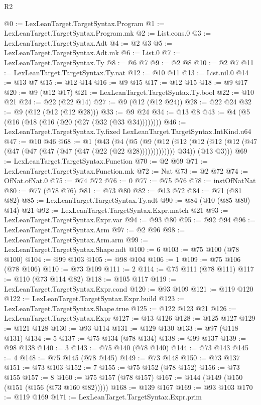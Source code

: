 \begin{lexlean}{R2}
\begin{coremodule}
@0 := LexLeanTarget.TargetSyntax.Program
@1 := LexLeanTarget.TargetSyntax.Program.mk
@2 := List.cons.{0}
@3 := LexLeanTarget.TargetSyntax.Adt
@4 := @2 @3
@5 := LexLeanTarget.TargetSyntax.Adt.mk
@6 := List.{0}
@7 := LexLeanTarget.TargetSyntax.Ty
@8 := @6 @7
@9 := @2 @8
@10 := @2 @7
@11 := LexLeanTarget.TargetSyntax.Ty.nat
@12 := @10 @11
@13 := List.nil.{0}
@14 := @13 @7
@15 := @12 @14
@16 := @9 @15
@17 := @12 @15
@18 := @9 @17
@20 := @9 (@12 @17)
@21 := LexLeanTarget.TargetSyntax.Ty.bool
@22 := @10 @21
@24 := @22 (@22 @14)
@27 := @9 (@12 (@12 @24))
@28 := @22 @24
@32 := @9 (@12 (@12 (@12 @28)))
@33 := @9 @24
@34 := @13 @8
@43 := @4 (@5 (@16 (@18 (@16 (@20 (@27 (@32 (@33 @34))))))))
@46 := LexLeanTarget.TargetSyntax.Ty.fixed LexLeanTarget.TargetSyntax.IntKind.u64
@47 := @10 @46
@68 := @1
    (@43
      (@4
        (@5
          (@9
            (@12 (@12 (@12 (@12 (@12 (@47 (@47 (@47 (@47 (@47 (@47 (@22 (@22 @28)))))))))))))
            @34))
        (@13 @3)))
@69 := LexLeanTarget.TargetSyntax.Function
@70 := @2 @69
@71 := LexLeanTarget.TargetSyntax.Function.mk
@72 := Nat
@73 := @2 @72
@74 := OfNat.ofNat.{0}
@75 := @74 @72
@76 := 0
@77 := @75 @76
@78 := instOfNatNat
@80 := @77 (@78 @76)
@81 := @73 @80
@82 := @13 @72
@84 := @71 (@81 @82)
@85 := LexLeanTarget.TargetSyntax.Ty.adt
@90 := @84 (@10 (@85 @80) @14) @21
@92 := LexLeanTarget.TargetSyntax.Expr.match @21
@93 := LexLeanTarget.TargetSyntax.Expr.var
@94 := @93 @80
@95 := @92 @94
@96 := LexLeanTarget.TargetSyntax.Arm
@97 := @2 @96
@98 := LexLeanTarget.TargetSyntax.Arm.arm
@99 := LexLeanTarget.TargetSyntax.Shape.adt
@100 := 6
@103 := @75 @100 (@78 @100)
@104 := @99 @103
@105 := @98 @104
@106 := 1
@109 := @75 @106 (@78 @106)
@110 := @73 @109
@111 := 2
@114 := @75 @111 (@78 @111)
@117 := @110 (@73 @114 @82)
@118 := @105 @117
@119 := LexLeanTarget.TargetSyntax.Expr.cond
@120 := @93 @109
@121 := @119 @120
@122 := LexLeanTarget.TargetSyntax.Expr.build
@123 := LexLeanTarget.TargetSyntax.Shape.true
@125 := @122 @123 @21
@126 := LexLeanTarget.TargetSyntax.Expr
@127 := @13 @126
@128 := @125 @127
@129 := @121 @128
@130 := @93 @114
@131 := @129 @130
@133 := @97 (@118 @131)
@134 := 5
@137 := @75 @134 (@78 @134)
@138 := @99 @137
@139 := @98 @138
@140 := 3
@143 := @75 @140 (@78 @140)
@144 := @73 @143
@145 := 4
@148 := @75 @145 (@78 @145)
@149 := @73 @148
@150 := @73 @137
@151 := @73 @103
@152 := 7
@155 := @75 @152 (@78 @152)
@156 := @73 @155
@157 := 8
@160 := @75 @157 (@78 @157)
@167 := @144 (@149 (@150 (@151 (@156 (@73 @160 @82)))))
@168 := @139 @167
@169 := @93 @103
@170 := @119 @169
@171 := LexLeanTarget.TargetSyntax.Expr.prim

\end{coremodule}
\end{lexlean}
